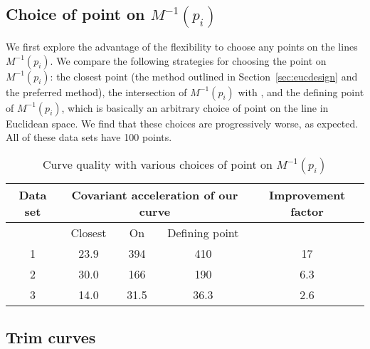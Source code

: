 \subsection{Choice of point on $M^{-1}(p_i)$}

We first explore the advantage of the flexibility 
to choose any points on the lines $M^{-1}(p_i)$.
We compare the following strategies for choosing the point on $M^{-1}(p_i)$:
the closest point (the method outlined in Section~\ref{sec:eucdesign}
and the preferred method),
the intersection of $M^{-1}(p_i)$ with , and
the defining point of $M^{-1}(p_i)$, which is basically
an arbitrary choice of point on the line in Euclidean space.
We find that these choices are progressively worse, as expected.
All of these data sets have 100 points.

\begin{table}[h]
\label{tab:cov}
\begin{tabular}{|c|c|c|c|c|}  	\hline
Data set & \multicolumn{3}{c|}{Covariant acceleration of our curve} & Improvement factor\\ \hline
	 & Closest & On \Sn{3} & Defining point & \\ \hline
1 & 23.9 & 394   & 410   &  17  \\ \hline
2 & 30.0 & 166   & 190	 &  6.3 \\ \hline
3 & 14.0 & 31.5  & 36.3  &  2.6 \\ \hline
\end{tabular}
\caption{Curve quality with various choices of point on $M^{-1}(p_i)$}
\end{table}

\subsection{Trim curves}


